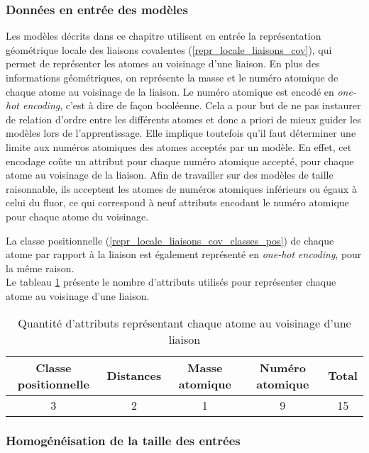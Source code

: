 \subsubsection{Données en entrée des modèles}
\par Les modèles décrits dans ce chapitre utilisent en entrée la représentation géométrique locale des liaisons covalentes (\ref{repr_locale_liaisons_cov}), qui permet de représenter les atomes au voisinage d'une liaison. En plus des informations géométriques, on représente la masse et le numéro atomique de chaque atome au voisinage de la liaison. Le numéro atomique est encodé en \emph{one-hot encoding}, c'est à dire de façon booléenne. Cela a pour but de ne pas instaurer de relation d'ordre entre les différents atomes et donc a priori de mieux guider les modèles lors de l'apprentissage. Elle implique toutefois qu'il faut déterminer une limite aux numéros atomiques des atomes acceptés par un modèle. En effet, cet encodage coûte un attribut pour chaque numéro atomique accepté, pour chaque atome au voisinage de la liaison. Afin de travailler sur des modèles de taille raisonnable, ils acceptent les atomes de numéros atomiques inférieurs ou égaux à celui du fluor, ce qui correspond à neuf attributs encodant le numéro atomique pour chaque atome du voisinage.
\par La classe positionnelle (\ref{repr_locale_liaisons_cov_classes_pos}) de chaque atome par rapport à la liaison est également représenté en \emph{one-hot encoding}, pour la même raison.\\
Le tableau \ref{table_taille_entree} présente le nombre d'attributs utilisés pour représenter chaque atome au voisinage d'une liaison.

\begin{table}
	\centering
	
	\begin{tabular}{|c|c|c|c|c|}
		\hline
		\textbf{Classe positionnelle} & \textbf{Distances} & \textbf{Masse atomique} & \textbf{Numéro atomique} & \textbf{Total}\\ \hline
		3 & 2 & 1 & 9 & 15\\ \hline
	\end{tabular}
	\caption{Quantité d'attributs représentant chaque atome au voisinage d'une liaison}
	\label{table_taille_entree}
\end{table}

\subsubsection{Homogénéisation de la taille des entrées}

